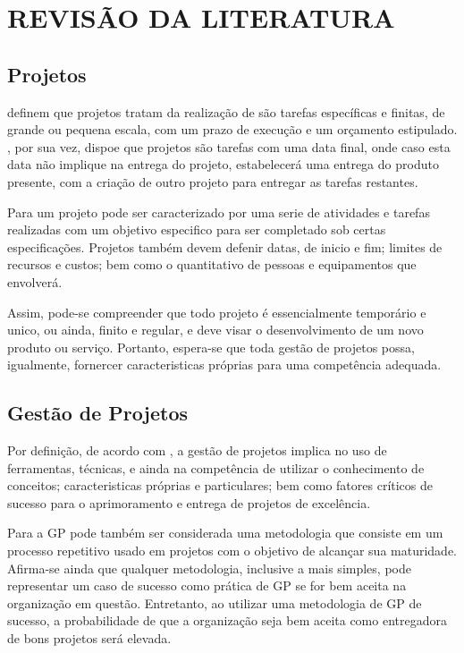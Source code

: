 \chapter{REVISÃO DA LITERATURA}
\thispagestyle{empty}

\section{Projetos}

 definem que projetos tratam da realização de são tarefas específicas e finitas, de grande ou pequena escala, com um prazo de execução e um orçamento estipulado. , por sua vez, dispoe que projetos são tarefas com uma data final, onde caso esta data não implique na entrega do projeto, estabelecerá uma entrega do produto presente, com a criação de outro projeto para entregar as tarefas restantes.

Para  um projeto pode ser caracterizado por uma serie de atividades e tarefas realizadas com um objetivo especifico para ser completado sob certas especificações. Projetos também devem defenir datas, de inicio e fim; limites de recursos e custos; bem como o quantitativo de pessoas e equipamentos que envolverá.

Assim, pode-se compreender que todo projeto é essencialmente temporário e unico, ou ainda, finito e regular, e deve visar o desenvolvimento de um novo produto ou serviço. Portanto, espera-se que toda gestão de projetos possa, igualmente, fornercer caracteristicas próprias para uma competência adequada.

\section{Gestão de Projetos}

Por definição, de acordo com , a gestão de projetos implica no uso de ferramentas, técnicas, e ainda na competência de utilizar o conhecimento de conceitos; caracteristicas próprias e particulares; bem como fatores críticos de sucesso para o aprimoramento e entrega de projetos de excelência.

Para  a GP pode também ser considerada uma metodologia que consiste em um processo repetitivo usado em projetos com o objetivo de alcançar sua maturidade. Afirma-se ainda que qualquer metodologia, inclusive a mais simples, pode representar um caso de sucesso como prática de GP se for bem aceita na organização em questão. Entretanto, ao utilizar uma metodologia de GP de sucesso, a probabilidade de que a organização seja bem aceita como entregadora de bons projetos será elevada\cite{kerzner2013project}.

